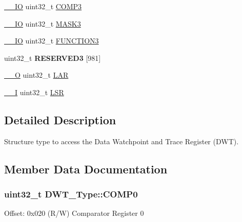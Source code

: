 \begin{DoxyCompactItemize}
\item 
\hyperlink{core__sc300_8h_aec43007d9998a0a0e01faede4133d6be}{\+\_\+\+\_\+\+IO} uint32\+\_\+t \hyperlink{struct_d_w_t___type_a3df15697eec279dbbb4b4e9d9ae8b62f}{C\+O\+M\+P3}
\item 
\hyperlink{core__sc300_8h_aec43007d9998a0a0e01faede4133d6be}{\+\_\+\+\_\+\+IO} uint32\+\_\+t \hyperlink{struct_d_w_t___type_ae3f01137a8d28c905ddefe7333547fba}{M\+A\+S\+K3}
\item 
\hyperlink{core__sc300_8h_aec43007d9998a0a0e01faede4133d6be}{\+\_\+\+\_\+\+IO} uint32\+\_\+t \hyperlink{struct_d_w_t___type_a80bd242fc05ca80f9db681ce4d82e890}{F\+U\+N\+C\+T\+I\+O\+N3}
\item 
uint32\+\_\+t {\bfseries R\+E\+S\+E\+R\+V\+E\+D3} \mbox{[}981\mbox{]}\hypertarget{struct_d_w_t___type_a5c0257af31b22a3e448446ac888d3a73}{}\label{struct_d_w_t___type_a5c0257af31b22a3e448446ac888d3a73}

\item 
\hyperlink{core__sc300_8h_a7e25d9380f9ef903923964322e71f2f6}{\+\_\+\+\_\+O} uint32\+\_\+t \hyperlink{struct_d_w_t___type_a0e69531f29f71c62cccac82417cda0f8}{L\+AR}
\item 
\hyperlink{core__sc300_8h_af63697ed9952cc71e1225efe205f6cd3}{\+\_\+\+\_\+I} uint32\+\_\+t \hyperlink{struct_d_w_t___type_a28449e73e4c03e372c9ee0bb1211a58a}{L\+SR}
\end{DoxyCompactItemize}


\subsection{Detailed Description}
Structure type to access the Data Watchpoint and Trace Register (D\+WT). 

\subsection{Member Data Documentation}
\subsubsection[{\texorpdfstring{C\+O\+M\+P0}{COMP0}}]{ uint32\+\_\+t D\+W\+T\+\_\+\+Type\+::\+C\+O\+M\+P0}\hypertarget{struct_d_w_t___type_a7cf71ff4b30a8362690fddd520763904}{}\label{struct_d_w_t___type_a7cf71ff4b30a8362690fddd520763904}
Offset\+: 0x020 (R/W) Comparator Register 0 
